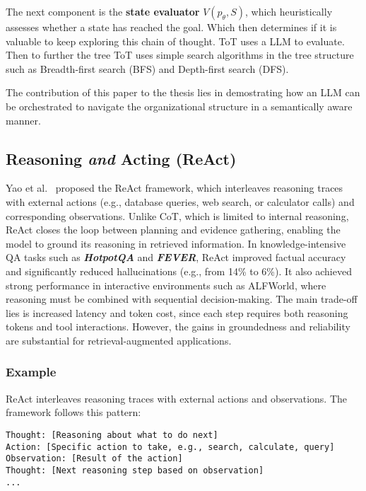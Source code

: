 The next component is the \textbf{state evaluator} $V(p_\theta,S)$, which heuristically assesses whether a state has reached the goal. Which then determines if it is valuable to keep exploring this chain of thought. ToT \cite{chainofthought} uses a \gls{LLM} to evaluate.
Then to further the tree ToT uses simple search algorithms in the tree structure such as Breadth-first search (BFS) and Depth-first search (DFS).

The contribution of this paper to the thesis lies in demostrating  how an \gls{LLM} can be orchestrated to navigate the organizational structure in a semantically aware manner.

\subsection{Reasoning \emph{and} Acting (ReAct)}
Yao et al.~\cite{react} proposed the ReAct framework, which interleaves reasoning traces with external actions (e.g., database queries, web search, or calculator calls) and corresponding observations. Unlike CoT, which is limited to internal reasoning, ReAct closes the loop between planning and evidence gathering, enabling the model to ground its reasoning in retrieved information. In knowledge-intensive QA tasks such as \textbf{\textit{HotpotQA}} and \textbf{\textit{FEVER}}, ReAct improved factual accuracy and significantly reduced hallucinations (e.g., from 14\% to 6\%). It also achieved strong performance in interactive environments such as ALFWorld, where reasoning must be combined with sequential decision-making. The main trade-off lies is increased latency and token cost, since each step requires both reasoning tokens and tool interactions. However, the gains in groundedness and reliability are substantial for retrieval-augmented applications.

\subsubsection{Example}
ReAct interleaves reasoning traces with external actions and observations. The framework follows this pattern:

\begin{lstlisting}[language={},basicstyle=\ttfamily\footnotesize,caption={ReAct Framework Pattern}]
Thought: [Reasoning about what to do next]
Action: [Specific action to take, e.g., search, calculate, query]
Observation: [Result of the action]
Thought: [Next reasoning step based on observation]
...
\end{lstlisting}


